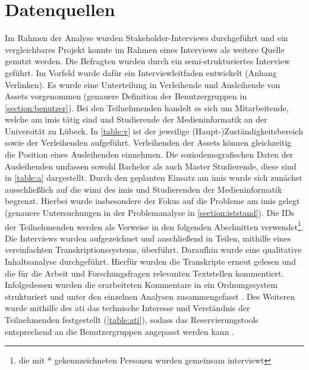 \section{Datenquellen}
\label{section:daten}
Im Rahmen der Analyse wurden Stakeholder-Interviews durchgeführt und ein vergleichbares Projekt
konnte im Rahmen eines Interviews als weitere Quelle genutzt werden. Die Befragten wurden durch ein
semi-strukturiertes Interview geführt. Im Vorfeld wurde dafür ein Interviewleitfaden entwickelt
(Anhang Verlinken). Es wurde eine Unterteilung in Verleihende und Ausleihende von Assets vorgenommen
(genauere Definition der Benutzergruppen in \ref{section:benutzer}). Bei den Teilnehmenden handelt
es sich um Mitarbeitende, welche am \ac{imis} tätig sind und Studierende der Medieninformatik an der
Universität zu Lübeck. In \ref{table:v} ist der jeweilige (Haupt-)Zuständigkeitsbereich sowie der
Verleihenden aufgeführt. Verleihenden der Assets können gleichzeitig die Position eines Ausleihenden
einnehmen. Die soziodemografischen Daten der Ausleihenden umfassen sowohl Bachelor als auch Master
Studierende, diese sind in \ref{table:a} dargestellt. Durch den geplanten Einsatz am \ac{imis} wurde
sich zunächst ausschließlich auf die \ac{wimi} des \ac{imis} und Studierenden der Medieninformatik
begrenzt. Hierbei wurde insbesondere der Fokus auf die Probleme am \ac*{imis} gelegt (genauere
Untersuchungen in der Problemanalyse in \ref{section:iststand}). Die IDs der Teilnehmenden werden
als Verweise in den folgenden Abschnitten verwendet\footnote{die mit * gekennzeichneten Personen
wurden gemeinsam interviewt}. Die Interviews wurden aufgezeichnet und anschließend in Teilen,
mithilfe eines vereinfachten Transkriptionssystems, überführt. Daraufhin wurde eine qualitative
Inhaltsanalyse durchgeführt. Hierfür wurden die Transkripte erneut gelesen und die für die Arbeit
und Forschungsfragen relevanten Textstellen kommentiert. Infolgedessen wurden die erarbeiteten
Kommentare in ein Ordnungssystem strukturiert und unter den einzelnen Analysen zusammengefasst
\cite{dresing_praxisbuch_2016}. Des Weiteren wurde mithilfe des \ac{ati} das technische Interesse
und Verständnis der Teilnehmenden festgestellt (\ref{table:ati}), sodass das Reservierungstools
entsprechend an die Benutzergruppen angepasst werden kann \cite{attig_assessing_2017}. 

